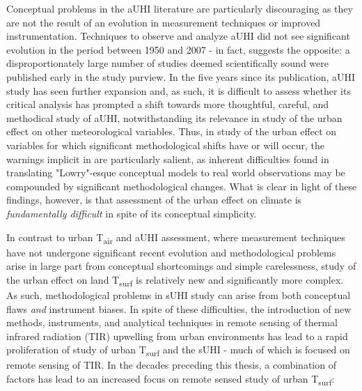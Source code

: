 \begin{bibunit}
Conceptual problems in the aUHI literature are particularly discouraging as they are not the result of an evolution in measurement techniques or improved instrumentation. Techniques to observe and analyze aUHI did not see significant evolution in the period between 1950 and 2007 - in fact, \citet{Stewart2011} suggests the opposite: a disproportionately large number of studies deemed scientifically sound were published early in the study purview. In the five years since its publication, aUHI study has seen further expansion and, as such, it is difficult to assess whether its critical analysis has prompted a shift towards more thoughtful, careful, and methodical study of aUHI, notwithstanding its relevance in study of the urban effect on other meteorological variables. Thus, in study of the urban effect on variables for which significant methodological shifts have or will occur, the warnings implicit in \citet{Stewart2011} are particularly salient, as inherent difficulties found in translating "Lowry"-esque conceptual models to real world observations may be compounded by significant methodological changes. What is clear in light of these findings, however, is that assessment of the urban effect on climate is \textit{fundamentally difficult} in spite of its conceptual simplicity. 


In contrast to urban T\textsubscript{air} and aUHI assessment, where measurement techniques have not undergone significant recent evolution and methodological problems arise in large part from conceptual shortcomings and simple carelessness, study of the urban effect on land T\textsubscript{surf} is relatively new and significantly more complex. As such, methodological problems in sUHI study can arise from both conceptual flaws \textit{and} instrument biases. In spite of these difficulties, the introduction of new methods, instruments, and analytical techniques in remote sensing of thermal infrared radiation (TIR) upwelling from urban environments has lead to a rapid proliferation of study of urban T\textsubscript{surf} and the sUHI - much of which is focused on remote sensing of TIR. In the decades preceding this thesis, a combination of factors has lead to an increased focus on remote sensed study of urban T\textsubscript{surf}: 


\end{bibunit}
